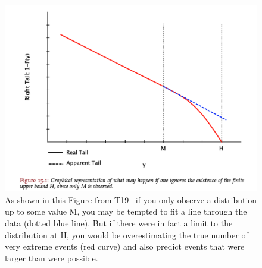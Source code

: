 \begin{figure}[htb!]
    \centering
    \includegraphics[width=1\linewidth]{images/nnt-upper-bound.png}
    \vspace{-15pt}
   \caption{As shown in this Figure from T19~\cite{taleb2019statistical} if you only
   observe a distribution up to some value M, you may be tempted to fit a line through the
   data (dotted blue line). But if there were in fact a limit to the distribution at H,
   you would be overestimating the true number of very extreme events (red curve)
   and also predict events that were larger than were possible.  }
   \label{fig:up-bound-taleb}

\end{figure}
